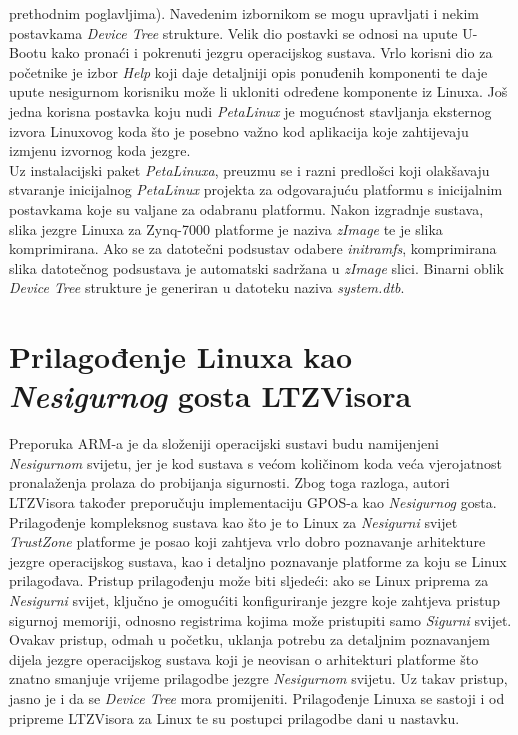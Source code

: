\documentclass[times, utf8, diplomski, numeric]{fer}
\begin{document}
prethodnim poglavljima). Navedenim izbornikom se mogu upravljati i nekim postavkama \textit{Device Tree} strukture. Velik dio
postavki se odnosi na upute U-Bootu kako pronaći i pokrenuti jezgru operacijskog sustava. Vrlo korisni dio za početnike je
izbor \textit{Help} koji daje detaljniji opis ponuđenih komponenti te daje upute nesigurnom korisniku može li ukloniti
određene komponente iz Linuxa. Još jedna korisna postavka koju nudi \textit{PetaLinux} je mogućnost stavljanja eksternog
izvora Linuxovog koda što je posebno važno kod aplikacija koje zahtijevaju izmjenu izvornog koda jezgre.\\
Uz instalacijski paket \textit{PetaLinuxa}, preuzmu se i razni predlošci koji olakšavaju stvaranje inicijalnog
\textit{PetaLinux} projekta za odgovarajuću platformu s inicijalnim postavkama koje su valjane za odabranu platformu. Nakon
izgradnje sustava, slika jezgre Linuxa za Zynq-7000 platforme je naziva \textit{zImage} te je slika komprimirana. Ako se
za datotečni podsustav odabere \textit{initramfs}, komprimirana slika datotečnog podsustava je automatski sadržana u
\textit{zImage} slici. Binarni oblik \textit{Device Tree} strukture je generiran u datoteku naziva \textit{system.dtb}.

\section{Prilagođenje Linuxa kao \textit{Nesigurnog} gosta LTZVisora}
Preporuka ARM-a je da složeniji operacijski sustavi budu namijenjeni \textit{Nesigurnom} svijetu, jer je kod sustava s većom
količinom koda veća vjerojatnost pronalaženja prolaza do probijanja sigurnosti. Zbog toga razloga, autori LTZVisora također
preporučuju implementaciju GPOS-a kao \textit{Nesigurnog} gosta. Prilagođenje kompleksnog sustava kao što je to Linux za \textit{Nesigurni}
svijet \textit{TrustZone} platforme je posao koji zahtjeva vrlo dobro poznavanje arhitekture jezgre operacijskog sustava, kao
i detaljno poznavanje platforme za koju se Linux prilagođava. Pristup prilagođenju može biti sljedeći: ako se Linux priprema
za \textit{Nesigurni} svijet, ključno je omogućiti konfiguriranje jezgre koje zahtjeva pristup sigurnoj memoriji, odnosno registrima
kojima može pristupiti samo \textit{Sigurni} svijet. Ovakav pristup, odmah u početku, uklanja potrebu za detaljnim poznavanjem
dijela jezgre operacijskog sustava koji je neovisan o arhitekturi platforme što znatno smanjuje vrijeme prilagodbe jezgre
\textit{Nesigurnom} svijetu. Uz takav pristup, jasno je i da se \textit{Device Tree} mora promijeniti. Prilagođenje Linuxa se sastoji
i od pripreme LTZVisora za Linux te su postupci prilagodbe dani u nastavku.
\end{document}
